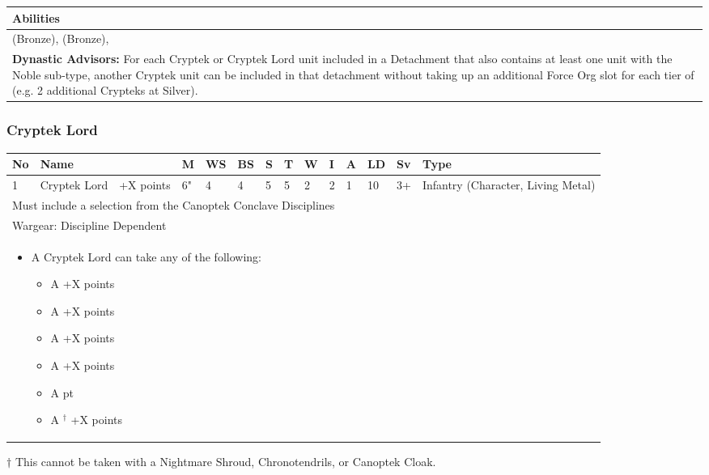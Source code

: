 \noindent
\begin{tabular}{||m{532pt}||}
	\hline
	Abilities \\
	\hline
	\quickref{Awakening Protocols}(Bronze), \quickref{Nodal Command} (Bronze), \quickref{Reanimation Protocols} \\
	\textbf{Dynastic Advisors:} For each Cryptek or Cryptek Lord unit included in a Detachment that also contains at least one unit with the Noble sub-type, another Cryptek unit can be included in that detachment without taking up an additional Force Org slot for each tier of \quickref{Command Protocols} (e.g. 2 additional Crypteks at Silver). \\
	\hline
\end{tabular}



\newpage
\subsubsection{Cryptek Lord}

\noindent
\begin{tabular}{||m{10pt} m{90pt} m{30pt} m{11pt} m{11pt} m{11pt} m{11pt} m{11pt} m{11pt} m{11pt} m{11pt} m{11pt} m{11pt} m{135pt}||}
	\hline
	No & Name & & M & WS & BS & S & T & W & I & A & LD & Sv & Type \\
	\hline
	1 & Cryptek Lord & +X points & 6" & 4 & 4 & 5 & 5 & 2 & 2 & 1 & 10 & 3+ & Infantry (Character, Living Metal)\\
	\hline
	\hline
	\multicolumn{14}{||Z{532 pt}||}{Must include a selection from the Canoptek Conclave Disciplines}\\
	\hline
	\hline
	\multicolumn{14}{||Z{532 pt}||}{Wargear: Discipline Dependent} \\		
	\multicolumn{14}{||Z{532 pt}||}{\begin{itemize}
			\item A Cryptek Lord can take any of the following:
			\begin{itemize}
				\item A \quickref{Mindshackle Scarabs} \hrulefill +X points
				\item A \quickref{Phase Shifter} \hrulefill +X points
				\item A \quickref{Phylactery} \hrulefill +X points
				\item A \quickref{Sempiternal Weave} \hrulefill +X points
				\item A \quickref{Tesseract Labyrinth} \hrulefill 100 pt
				\item A \quickref{Translocation Shroud}$^\dagger$ \hrulefill +X points
			\end{itemize}
	\end{itemize}} \\	
	\hline
\end{tabular}
\begin{tablenotes}
	\item{ $\dagger$ This cannot be taken with a Nightmare Shroud, Chronotendrils, or Canoptek Cloak.}
\end{tablenotes}

